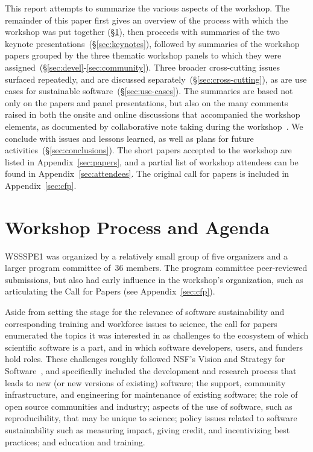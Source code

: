 \documentclass[11pt, oneside]{amsart}
\begin{document}
This report attempts to summarize the various aspects of the workshop.
The remainder of this paper first gives an overview of the process
with which the workshop was put together (\S\ref{sec:process}), then
proceeds with summaries of the two keynote
presentations~(\S\ref{sec:keynotes}), followed by summaries of the
workshop papers grouped by the three thematic workshop panels to which
they were assigned~(\S\ref{sec:devel}-\ref{sec:community}). Three
broader cross-cutting issues surfaced repeatedly, and are discussed
separately~(\S\ref{sec:cross-cutting}), as are use cases for
sustainable software~(\S\ref{sec:use-cases}). The summaries are based
not only on the papers and panel presentations, but also on the many
comments raised in both the onsite and online discussions that
accompanied the workshop elements, as documented by collaborative note
taking during the workshop~\cite{WSSSPE1-google-notes}. We conclude
with issues and lessons learned, as well as plans for future
activities~(\S\ref{sec:conclusions}).  The short papers accepted to
the workshop are listed in Appendix~\ref{sec:papers}, and a partial
list of workshop attendees can be found in
Appendix~\ref{sec:attendees}. The original call for papers is included in 
Appendix~\ref{sec:cfp}. 

\section{Workshop Process and Agenda} \label{sec:process}

WSSSPE1 was organized by a relatively small group of five organizers
and a larger program committee of~36 members. The program committee
peer-reviewed submissions, but also had early influence in the
workshop's organization, such as articulating the Call for Papers (see
Appendix~\ref{sec:cfp}).

Aside from setting the stage for the relevance of software
sustainability and corresponding training and workforce issues to
science, the call for papers enumerated the topics it was interested
in as challenges to the ecosystem of which scientific software is a
part, and in which software developers, users, and funders hold
roles. These challenges roughly followed NSF's Vision and Strategy for
Software~\cite{NSF_software_vision}, and specifically included the
development and research process that leads to new (or new versions of
existing) software; the support, community infrastructure, and
engineering for maintenance of existing software; the role of open
source communities and industry; aspects of the use of software, such
as reproducibility, that may be unique to science; policy issues
related to software sustainability such as measuring impact, giving
credit, and incentivizing best practices; and education and training.
\end{document}
